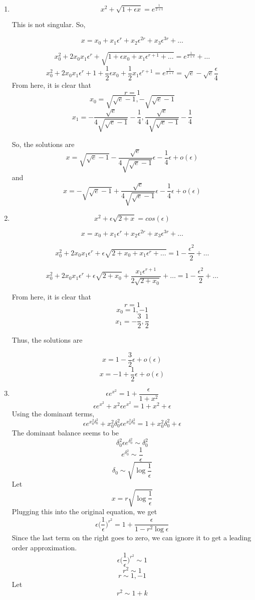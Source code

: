 \documentclass[letterpaper,12pt]{article}
\begin{document}
\begin{enumerate}
\item
\[x^2 + \sqrt{1+ \epsilon x} = e^{\frac{1}{2+\epsilon}}\]

This is not singular. So,

\[x = x_0 + x_1\epsilon^{r}+ x_2\epsilon^{2r} + x_3\epsilon^{3r} +\hdots\]

\[x_0^2+ 2 x_0 x_1 \epsilon^r + \sqrt{1+ \epsilon x_0 + x_1\epsilon^{r+1} +\hdots} = e^{\frac{1}{2+\epsilon}}+ \hdots \]
\[x_0^2+ 2 x_0 x_1 \epsilon^r + 1+  \frac{1}{2} \epsilon  x_0 +\frac{1}{2} x_1\epsilon^{r+1}  = e^{\frac{1}{2+\epsilon}} = \sqrt{e}-\sqrt{e}\frac{\epsilon}{4}\]
From here, it is clear that
\[r = 1\]
\[x_0 = \sqrt{\sqrt{e}-1},- \sqrt{\sqrt{e}-1}\]
\[x_1 =- \frac{\sqrt{e}}{4\sqrt{\sqrt{e}-1}} - \frac{1}{4}, \frac{\sqrt{e}}{4\sqrt{\sqrt{e}-1}} - \frac{1}{4}\]

So, the solutions are
\[x = \sqrt{\sqrt{e}-1} - \frac{\sqrt{e}}{4\sqrt{\sqrt{e}-1}}\epsilon - \frac{1}{4}\epsilon + o(\epsilon )\]
and
\[x = -\sqrt{\sqrt{e}-1} + \frac{\sqrt{e}}{4\sqrt{\sqrt{e}-1}}\epsilon - \frac{1}{4}\epsilon + o(\epsilon )\]
\item
\[x^2 + \epsilon\sqrt{2+x}= cos(\epsilon)\]

\[x = x_0 + x_1\epsilon^{r}+ x_2\epsilon^{2r} + x_3\epsilon^{3r} +\hdots\]

\[x_0^2+ 2 x_0 x_1 \epsilon^r + \epsilon \sqrt{2+ x_0 + x_1\epsilon^{r}+\hdots}=1-\frac{\epsilon^2}{2}+\hdots\]

\[x_0^2+ 2 x_0 x_1 \epsilon^r + \epsilon \sqrt{2+ x_0} +\frac{ x_1\epsilon^{r+1}}{2\sqrt{2+ x_0}} +\hdots=1-\frac{\epsilon^2}{2}+\hdots \]

From here, it is clear that
\[r = 1\]
\[x_0 = 1,-1\]
\[x_1 = - \frac{3}{2}, \frac{1}{2}\]

Thus, the solutions are

\[x =1 - \frac{3}{2}\epsilon +o(\epsilon)\]
\[x =-1 + \frac{1}{2}\epsilon +o(\epsilon)\]
\item
\[ \epsilon e^{x^2}= 1 + \frac{\epsilon}{1+x^2}\]
\[ \epsilon e^{x^2}+ x^2 \epsilon e^{x^2}= 1+ x^2 + \epsilon\]
Using  the dominant terms,
\[ \epsilon e^{x_0^2 \delta_0^2}+ x_0^2\delta_0^2 \epsilon e^{x_0^2\delta_0^2}= 1+ x_0^2\delta_0^2 + \epsilon\]
The dominant balance seems to be
\[ \delta_0^2 \epsilon e^{\delta_0^2} \sim \delta_0^2 \]
\[ e^{\delta_0^2} \sim \frac{1}{\epsilon}\]
\[ \delta_0 \sim \sqrt{\log \frac{1}{\epsilon}}\]
Let
\[x = r  \sqrt{\log \frac{1}{\epsilon}} \]
Plugging this into the original equation, we get
\[\epsilon \bigg(\frac{1}{\epsilon}\bigg)^{r^2} = 1 + \frac{\epsilon}{1-r^2 \log \epsilon}\]
Since the last term on the right goes to zero, we can ignore it to get a leading order approximation.
\[\epsilon \bigg(\frac{1}{\epsilon}\bigg)^{r^2} \sim 1 \]
\[r^2 \sim 1\]
\[r \sim 1, -1\]
Let
\[r^2 \sim 1 + k\]



\end{enumerate}
\end{document}
